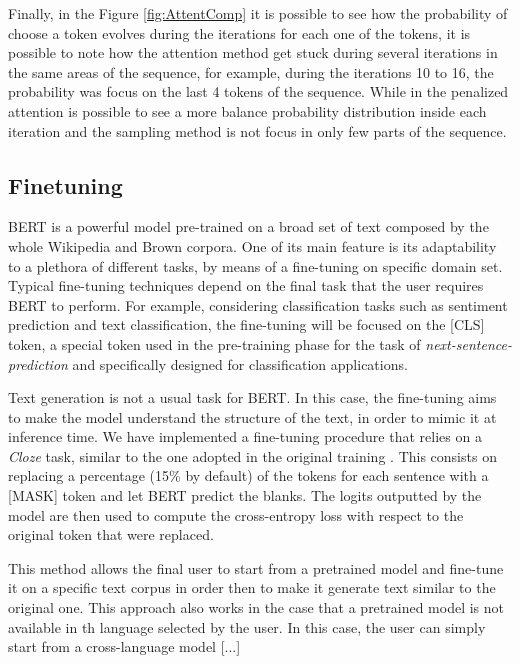 \documentclass[10pt,twocolumn,letterpaper]{article}
\begin{document}
Finally, in the Figure \ref{fig:AttentComp} it is possible to see how the probability of choose a token evolves
during the iterations for each one of the tokens, it is possible to note how the attention method
get stuck during several iterations in the same areas of the sequence, for example, during the iterations
10 to 16, the probability was focus on the last 4 tokens of the sequence.
While in the penalized attention is possible to see a more balance probability distribution inside each iteration
and the sampling method is not focus in only few parts of the sequence.
\subsection{Finetuning}
BERT is a powerful model pre-trained on a broad set of text composed by the whole
Wikipedia and Brown corpora.
One of its main feature is its adaptability to a plethora of different tasks,
by means of a fine-tuning on specific domain set.
Typical fine-tuning techniques depend on the final task that the user requires BERT to perform.
For example, considering classification tasks such as sentiment prediction and text classification,
the fine-tuning will be focused on the [CLS] token, a special token used in the pre-training phase for the task
of \textit{next-sentence-prediction} and specifically designed for classification applications.

Text generation is not a usual task for BERT.
In this case, the fine-tuning aims to make the model understand the structure of the text,
in order to mimic it at inference time.
We have implemented a fine-tuning procedure that relies on a \textit{Cloze} task, similar to the one adopted in the
 original training \cite{wang2019bert}.
This consists on replacing a percentage (15\% by default) of the tokens for each sentence with a [MASK] token and let
BERT predict the blanks. The logits outputted by the model are then used to compute the cross-entropy
loss with respect to the original token that were replaced.

This method allows the final user to start from a pretrained model and fine-tune it on a specific
text corpus in order then to make it generate text similar to the original one.
This approach also works  in the case that a pretrained model is not available in th language selected by the user.
In this case, the user can simply start from a cross-language model [...]
\end{document}
